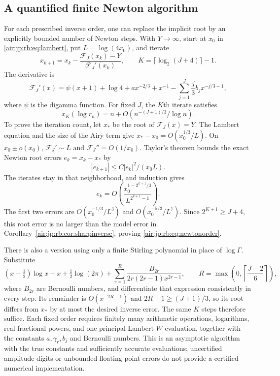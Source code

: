 \documentclass[11pt,letterpaper]{article}
\numberwithin{equation}{section}
\theoremstyle{remark}
\begin{document}
\subsection{A quantified finite Newton algorithm}
For each prescribed inverse order, one can replace the implicit root by an explicitly bounded number of Newton steps. With $Y\to\infty$, start at $x_0$ in \eqref{air:jp:rb:eq:lambert}, put $L=\log(4x_0)$, and iterate
\begin{equation}\label{air:jp:rb:eq:newton}
 x_{k+1}=x_k-\frac{\mathcal F_J(x_k)-Y}{\mathcal F_J'(x_k)},
 \qquad K=\lceil\log_2(J+4)\rceil-1.
\end{equation}
The derivative is
\[
 \mathcal F_J'(x)=\psi(x+1)+\log4+ax^{-2/3}+x^{-1}
             -\sum_{j=1}^J\frac j3b_jx^{-j/3-1},
\]
where $\psi$ is the digamma function. For fixed $J$, the $K$th iterate satisfies
\begin{equation}\label{air:jp:rb:eq:newtonorder}
 x_K(\log r_n)=n+O\!\left(n^{-(J+1)/3}/\log n\right).
\end{equation}
To prove the iteration count, let $x_*$ be the root of $\mathcal F_J(x)=Y$. The Lambert equation and the size of the Airy term give
$x_*-x_0=O(x_0^{1/3}/L)$. On $x_0\pm o(x_0)$,
$\mathcal F_J'\sim L$ and $\mathcal F_J''=O(1/x_0)$. Taylor's theorem bounds the exact Newton root errors $e_k=x_k-x_*$ by
\[
 |e_{k+1}|\le C|e_k|^2/(x_0L).
\]
The iterates stay in that neighborhood, and induction gives
\[
 e_k=O\!\left(\frac{x_0^{1-2^{k+1}/3}}{L^{2^{k+1}-1}}\right).
\]
The first two errors are $O(x_0^{-1/3}/L^3)$ and $O(x_0^{-5/3}/L^7)$. Since $2^{K+1}\ge J+4$, this root error is no larger than the model error in Corollary~\ref{air:jp:rb:cor:sharpinverse}, proving \eqref{air:jp:rb:eq:newtonorder}.

There is also a version using only a finite Stirling polynomial in place of $\log\Gamma$. Substitute
\[
 (x+\tfrac12)\log x-x+\tfrac12\log(2\pi)
 +\sum_{r=1}^{R}\frac{B_{2r}}{2r(2r-1)x^{2r-1}},
 \qquad R=\max\!\left(0,\left\lceil\frac{J-2}{6}\right\rceil\right),
\]
where $B_{2r}$ are Bernoulli numbers, and differentiate that expression consistently in every step. Its remainder is $O(x^{-2R-1})$ and $2R+1\ge(J+1)/3$, so its root differs from $x_*$ by at most the desired inverse error. The same $K$ steps therefore suffice. Each fixed order requires finitely many arithmetic operations, logarithms, real fractional powers, and one principal Lambert-$W$ evaluation, together with the constants $a,\gamma_r,b_j$ and Bernoulli numbers. This is an asymptotic algorithm with the true constants and sufficiently accurate evaluations; uncertified amplitude digits or unbounded floating-point errors do not provide a certified numerical implementation.
\end{document}
